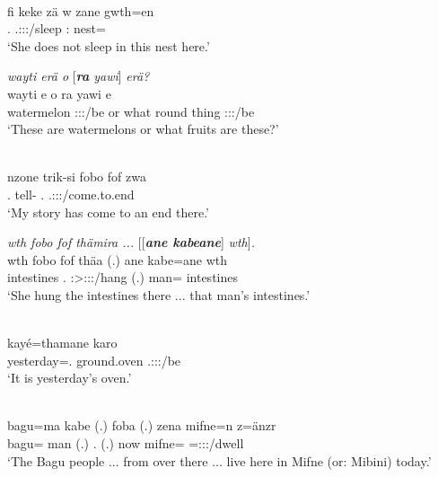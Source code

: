 \begin{exe}
 	\\
 	\gll fi keke zä w zane gwth=en\\
 	\Third.\Abs{} \Neg{} \Prox{} \Tsg.\F:\Sbj:\Nonpast:\Ipfv/sleep \Dem:\Prox{} nest=\Loc{}\\
 	\trans `She does not sleep in this nest here.'
 	\label{ex512}
\end{exe}
\begin{exe}
 	\ex \emph{wayti erä o} [\emph{\textbf{ra} yawi}] \emph{erä?}\\
 	\gll wayti e o ra yawi e\\
 	watermelon \Stpl:\Sbj:\Nonpast:\Ipfv/be or what {round thing} \Stpl:\Sbj:\Nonpast:\Ipfv/be\\
 	\trans `These are watermelons or what fruits are these?'
 	\label{ex513}
\end{exe}
\begin{exe}
 	\\
 	\gll nzone trik-si fobo fof zwa\\
 	\Fsg.\Poss{} tell-\Nmlz{} \Dist.\All{} \Emph{} \Tsg.\F:\Sbj:\Rpst:\Ipfv/come.to.end\\
 	\trans `My story has come to an end there.'
 	\label{ex514}
\end{exe}
\begin{exe}
 	\ex \emph{wth fobo fof thämira ...} [[\emph{\textbf{ane kabeane}}] \emph{wth}]\emph{.}\\
 	\gll wth fobo fof thäa (.) ane kabe=ane wth\\
 	intestines \Dist.\All{} \Emph{} \Stsg:\Sbj>\Stpl:\Obj:\Pst:\Pfv/hang (.) \Dem{} man=\Poss{} intestines\\
 	\trans `She hung the intestines there ... that man's intestines.'\\
 	\label{ex515}
\end{exe}
\begin{exe}
	\\
	\gll kayé=thamane karo \\
	yesterday=\Temp.\Poss{} {ground.oven} \Tsg.\F:\Sbj:\Nonpast:\Ipfv/be\\
	\trans `It is yesterday's oven.'
	\label{ex516}
\end{exe}
\begin{exe}
 	\\
 	\gll bagu=ma kabe (.) foba (.) zena mifne=n z=änzr\\
 	bagu=\Char{} man (.) \Dist.\Abl{} (.) now mifne=\Loc{} \Prox=\Stpl:\Sbj:\Nonpast:\Ipfv/dwell\\
 	\trans `The Bagu people ... from over there ... live here in Mifne (or: Mibini) today.'
 	\label{ex517}
\end{exe}

